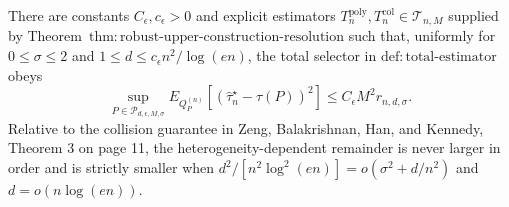 There are constants \(C_{\epsilon},c_{\epsilon}>0\) and explicit estimators \(T_n^{\mathrm{poly}},T_n^{\mathrm{col}}\in\mathcal T_{n,M}\) supplied by Theorem~\(\mathrm{thm:robust\text{-}upper\text{-}construction\text{-}resolution}\) such that, uniformly for \(0\le\sigma\le2\) and \(1\le d\le c_{\epsilon}n^2/\log(en)\), the total selector in \(\mathrm{def:total\text{-}estimator}\) obeys \[\sup_{P\in\mathcal P_{d,\epsilon,M,\sigma}}E_{Q_P^{(n)}}[(\widehat\tau_n^{\star}-\tau(P))^2]\le C_{\epsilon}M^2r_{n,d,\sigma}.\] Relative to the collision guarantee in Zeng, Balakrishnan, Han, and Kennedy, Theorem 3 on page 11, the heterogeneity-dependent remainder is never larger in order and is strictly smaller when \(d^2/[n^2\log^2(en)]=o(\sigma^2+d/n^2)\) and \(d=o(n\log(en))\).